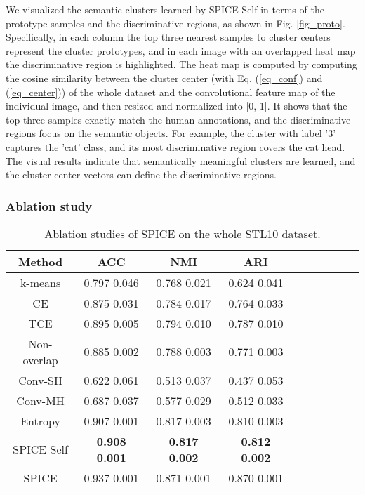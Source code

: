 \documentclass[10pt,twocolumn,letterpaper]{article}
\begin{document}
We visualized the semantic clusters learned by SPICE-Self in terms of the prototype samples and the discriminative regions, as shown in Fig. \ref{fig_proto}.
Specifically, in each column the top three nearest samples to cluster centers represent the cluster prototypes, and in each image with an overlapped heat map the discriminative region is highlighted. The heat map is computed by computing the cosine similarity between the cluster center (with Eq. (\ref{eq_conf}) and (\ref{eq_center})) of the whole dataset and the convolutional feature map of the individual image, and then resized and normalized into [0, 1]. It shows that the top three samples exactly match the human annotations, and the discriminative regions focus on the semantic objects. For example, the cluster with label '3' captures the 'cat' class, and its most discriminative region covers the cat head. The visual results indicate that semantically meaningful clusters are learned, and the cluster center vectors can define the discriminative regions.


\subsubsection{Ablation study}
\label{sec_abl}


\begin{table}[ht]
\footnotesize
\renewcommand\tabcolsep{6.8pt}
\caption{ Ablation studies of SPICE on the whole STL10 dataset.}
\label{table_results_abl}
\centering
\begin{tabular}{|c|ccc|ccc|ccc|}

\hline

Method                          & ACC&NMI&ARI\\

\hline\hline
k-means                                          & 0.797  0.046 & 0.768  0.021 & 0.624  0.041     \\
CE                                               & 0.875  0.031 & 0.784  0.017 & 0.764  0.033     \\
TCE                                              & 0.895  0.005 & 0.794  0.010 & 0.787  0.010     \\
Non-overlap                                      & 0.885  0.002 & 0.788  0.003 & 0.771  0.003     \\
Conv-SH                                          & 0.622  0.061 & 0.513  0.037 & 0.437  0.053     \\
Conv-MH                                          & 0.687  0.037 & 0.577  0.029 & 0.512  0.033     \\
Entropy                                          & 0.907  0.001 & 0.817  0.003 & 0.810  0.003     \\
\hline
SPICE-Self                                       & \textbf{0.908  0.001} & \textbf{0.817  0.002} & \textbf{0.812  0.002}    \\
SPICE                                         & 0.937  0.001 & 0.871  0.001 & 0.870  0.001   \\
\hline
\end{tabular}
\end{table}
\end{document}
